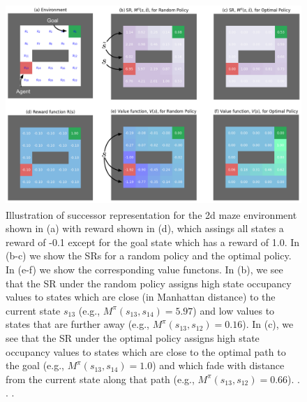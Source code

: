 \begin{figure}
\centering
\includegraphics[height=3in]{figs/successor-rep}
\caption{
  Illustration of successor representation for
  the 2d maze environment shown in (a) with reward
  shown in (d), which assings all states a reward of -0.1
  except for the goal state which has a reward of 1.0.
  In (b-c) we show the  SRs for a random policy and the optimal policy.
  In (e-f) we show the corresponding value functons.
%
  In (b), we see that the SR under the random policy
  assigns high state occupancy values to states which are close
  (in Manhattan distance)
  to the current state $s_{13}$
  (e.g., $M^{\pi}(s_{13}, s_{14})=5.97$)
  and low values to states that are further away
  (e.g., $M^{\pi}(s_{13}, s_{12})=0.16$).
%
  In (c), we see that the SR under the optimal policy
  assigns high state occupancy values to states which are close
  to the optimal path to the goal
  (e.g., $M^{\pi}(s_{13}, s_{14})=1.0$)
  and which fade with distance from the current state
  along that path
  (e.g., $M^{\pi}(s_{13}, s_{12})=0.66$).
  .
  .
  .
}
\label{fig:successorRep}
\end{figure}

